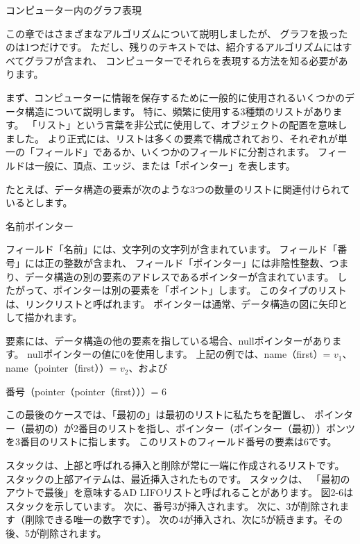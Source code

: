 
コンピューター内のグラフ表現

この章ではさまざまなアルゴリズムについて説明しましたが、
グラフを扱ったのは1つだけです。 ただし、残りのテキストでは、紹介するアルゴリズムにはすべてグラフが含まれ、
コンピューターでそれらを表現する方法を知る必要があります。

まず、コンピューターに情報を保存するために一般的に使用されるいくつかのデータ構造について説明します。 
特に、頻繁に使用する3種類のリストがあります。 「リスト」という言葉を非公式に使用して、オブジェクトの配置を意味しました。
より正式には、リストは多くの要素で構成されており、それぞれが単一の「フィールド」であるか、いくつかのフィールドに分割されます。 
フィールドは一般に、頂点、エッジ、または「ポインター」を表します。

たとえば、データ構造の要素が次のような3つの数量のリストに関連付けられているとします。

名前ポインター

フィールド「名前」には、文字列の文字列が含まれています。 フィールド「番号」には正の整数が含まれ、
フィールド「ポインター」には非陰性整数、つまり、データ構造の別の要素のアドレスであるポインターが含まれています。 
したがって、ポインターは別の要素を「ポイント」します。 このタイプのリストは、リンクリストと呼ばれます。
ポインターは通常、データ構造の図に矢印として描かれます。

要素には、データ構造の他の要素を指している場合、nullポインターがあります。
nullポインターの値に0を使用します。 上記の例では、name（first）= $ v_1 $、name（pointer（first））= $ v_2 $、および

番号（pointer（pointer（first）））= 6

この最後のケースでは、「最初の」は最初のリストに私たちを配置し、
ポインター（最初の）が2番目のリストを指し、ポインター（ポインター（最初））ポンツを3番目のリストに指します。
このリストのフィールド番号の要素は6です。

スタックは、上部と呼ばれる挿入と削除が常に一端に作成されるリストです。
スタックの上部アイテムは、最近挿入されたものです。 スタックは、
「最初のアウトで最後」を意味するAD LIFOリストと呼ばれることがあります。 図2-6はスタックを示しています。
次に、番号3が挿入されます。 次に、3が削除されます（削除できる唯一の数字です）。
次の4が挿入され、次に5が続きます。その後、5が削除されます。